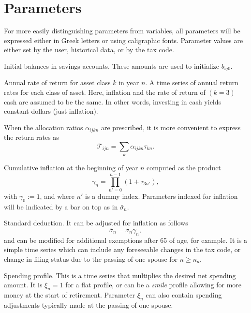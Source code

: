 \documentclass{report}[fleqn,12pt]
\begin{document}
\section{Parameters}
For more easily distinguishing parameters from variables, all parameters will be expressed either in Greek letters
or using caligraphic fonts.
Parameter values are either set by the user, historical data, or by the tax code.
\begin{description}[leftmargin=4em,style=multiline]
\item [$\beta{ij}$]
	Initial balances in savings accounts. These amounts are used to initialize $b_{ij0}$.
\item [$\tau_{kn}$]
	Annual rate of return for asset class $k$ in year $n$.
	A time series of annual return rates for each class of asset.
	Here, inflation and the rate of return of $(k=3)$ cash are assumed to be the same.
	In other words, investing in cash yields constant dollars (just inflation).
\item[$\mathcal{T}_{ijn}$]
	When the allocation ratios $\alpha_{ijkn}$ are prescribed,
	it is more convenient to express the return rates as
	\begin{equation}
		\mathcal{T}_{ijn} = \sum_k \alpha_{ijkn} \tau_{kn}.
	\end{equation}
\item [$\gamma_n$]
	Cumulative inflation at the beginning of year $n$ computed as the product
	\begin{equation}
		\gamma_n = \prod_{n' = 0}^{n-1} (1 + \tau_{3n'}),
	\end{equation}
	with $\gamma_0 := 1$, and where $n'$ is a dummy index.
	Parameters indexed for inflation will be indicated by a bar on top as in $\bar\sigma_n$.
\item [$\sigma_n$]
	Standard deduction. It can be adjusted for inflation as follows
	\begin{equation}
		\bar\sigma_n = \sigma_n \gamma_n,
	\end{equation}
	and can be modified for additional exemptions after 65 of age, for example.
	It is a simple time series
	which can include any foreseeable changes in the tax code, or change in filing status due to the
	passing of one spouse for $n\ge n_d$.
\item [$\xi_{n}$]
	Spending profile. This is a time series that multiplies the desired net spending amount.
	It is $\xi_n =1$ for
	a flat profile, or can be a {\em smile} profile allowing for more money at the start
	of retirement. Parameter
	$\xi_n$ can also contain spending adjustments typically made at the passing of one spouse.

\end{description}
\end{document}

